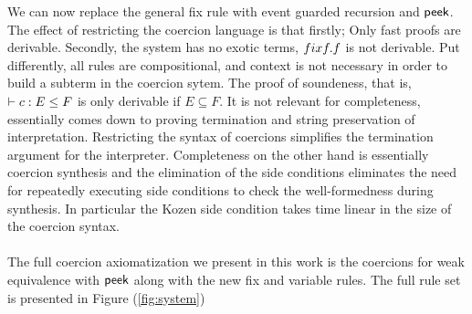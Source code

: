 \documentclass[a4paper,UKenglish,cleveref, autoref, thm-restate]{lipics-v2021}
\begin{document}
We can now replace the general fix rule with event guarded recursion and $\textsf{peek}$. The effect of restricting the coercion language is that firstly; Only fast proofs are derivable. Secondly, the system has no exotic terms, $\fix f. f$ is not derivable. Put differently, all rules are compositional, and context is not necessary in order to build a subterm in the coercion sytem. The proof of soundeness, that is,  $\contains{}{c}{E}{F}$ is only derivable if $E \subseteq F$. It is not relevant for completeness, essentially comes down to proving termination and string preservation of interpretation. Restricting the syntax of coercions simplifies the termination argument for the interpreter. Completeness on the other hand is essentially coercion synthesis and the elimination of the side conditions eliminates the need for repeatedly executing side conditions to check the well-formedness during synthesis. In particular the Kozen side condition takes time linear in the size of the coercion syntax.\\\\
The full coercion axiomatization we present in this work is the coercions for weak equivalence with $\textsf{peek}$ along with the new fix and variable rules. The full rule set is presented in Figure (\ref{fig:system})
\end{document}
